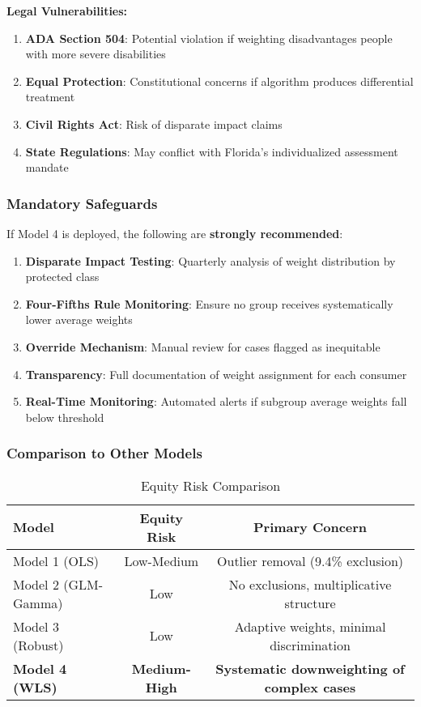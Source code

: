\textbf{Legal Vulnerabilities:}
\begin{enumerate}
    \item \textbf{ADA Section 504}: Potential violation if weighting disadvantages people with more severe disabilities
    \item \textbf{Equal Protection}: Constitutional concerns if algorithm produces differential treatment
    \item \textbf{Civil Rights Act}: Risk of disparate impact claims
    \item \textbf{State Regulations}: May conflict with Florida's individualized assessment mandate
\end{enumerate}

\subsubsection{Mandatory Safeguards}

If Model 4 is deployed, the following are \textbf{strongly recommended}:

\begin{enumerate}
    \item \textbf{Disparate Impact Testing}: Quarterly analysis of weight distribution by protected class
    \item \textbf{Four-Fifths Rule Monitoring}: Ensure no group receives systematically lower average weights
    \item \textbf{Override Mechanism}: Manual review for cases flagged as inequitable
    \item \textbf{Transparency}: Full documentation of weight assignment for each consumer
    \item \textbf{Real-Time Monitoring}: Automated alerts if subgroup average weights fall below threshold
\end{enumerate}

\subsubsection{Comparison to Other Models}

\begin{table}[h]
\centering
\caption{Equity Risk Comparison}
\begin{tabular}{lcc}
\toprule
\textbf{Model} & \textbf{Equity Risk} & \textbf{Primary Concern} \\
\midrule
Model 1 (OLS) & Low-Medium & Outlier removal (9.4\% exclusion) \\
Model 2 (GLM-Gamma) & Low & No exclusions, multiplicative structure \\
Model 3 (Robust) & Low & Adaptive weights, minimal discrimination \\
\textbf{Model 4 (WLS)} & \textbf{Medium-High} & \textbf{Systematic downweighting of complex cases} \\
\bottomrule
\end{tabular}
\end{table}

